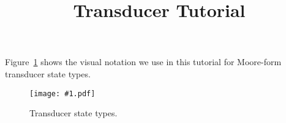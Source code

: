 \documentclass{article}
\newcommand{\figref}[1]{Figure~\ref{Figures.#1}}
\newcommand{\figlabel}[1]{\label{Figures.#1}}
\newcommand{\easyfig}[2]{
\begin{figure}
\texttt{[image: \#1.pdf]}
\caption{ \figlabel{#1} #2}
\end{figure}}
\begin{document}
\title{Transducer Tutorial}
\date{}
\maketitle


\figref{legend} shows the visual notation we use in this tutorial for Moore-form transducer state types.
\easyfig{legend}{Transducer state types.}
\end{document}
